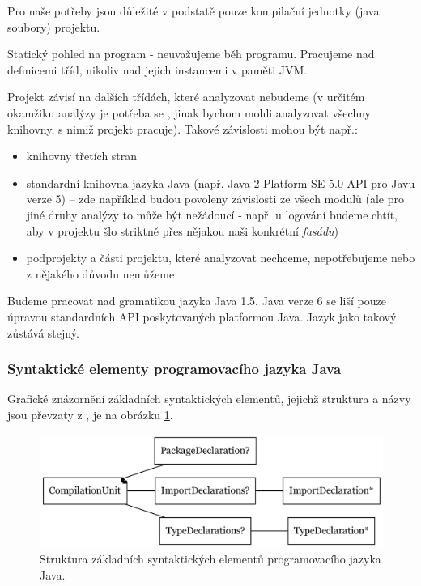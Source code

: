 Pro naše potřeby jsou důležité v podstatě pouze kompilační jednotky (java soubory) projektu.

Statický pohled na program - neuvažujeme běh programu. Pracujeme nad definicemi tříd, nikoliv nad jejich instancemi v paměti JVM.

Projekt závisí na dalších třídách, které analyzovat nebudeme (v určitém okamžiku analýzy je potřeba se , jinak bychom mohli analyzovat všechny knihovny, s nimiž projekt pracuje). Takové závislosti mohou být např.:

\begin{itemize}
\item knihovny třetích stran
\item standardní knihovna jazyka Java (např. Java 2 Platform SE 5.0 API pro Javu verze 5) -- zde například budou povoleny závislosti ze všech modulů (ale pro jiné druhy analýzy to může být nežádoucí - např. u logování budeme chtít, aby v projektu šlo striktně přes nějakou naši konkrétní \emph{fasádu})
\item podprojekty a části projektu, které analyzovat nechceme, nepotřebujeme nebo z nějakého důvodu nemůžeme
\end{itemize}

Budeme pracovat nad gramatikou jazyka Java 1.5. Java verze 6 se liší pouze úpravou standardních API poskytovaných platformou Java. Jazyk jako takový zůstává stejný.

\subsubsection{Syntaktické elementy programovacího jazyka Java}
Grafické znázornění základních syntaktických elementů, jejichž struktura a názvy jsou převzaty z \cite{Gosling:2005:JLS:1036643}, je na obrázku \ref{toplevel_elements}.
\begin{figure}[h!]
  \centering
  \includegraphics[width=\textwidth]{./graphs/java_top_elements.png}
  \caption{Struktura základních syntaktických elementů programovacího jazyka Java.\label{toplevel_elements}}
\end{figure}

